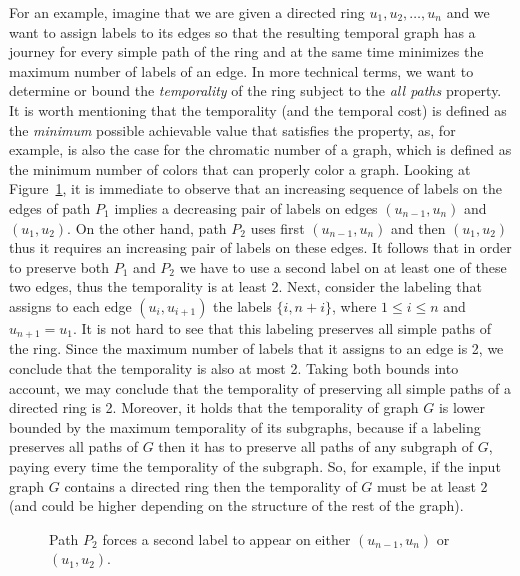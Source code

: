 \documentclass[oribibl, 11pt]{llncs}
\begin{document}
For an example, imagine that we are given a directed ring $u_1,u_2,\ldots,u_n$ and we want to assign labels to its edges so that the resulting temporal graph has a journey for every simple path of the ring and at the same time minimizes the maximum number of labels of an edge. In more technical terms, we want to determine or bound the \emph{temporality} of the ring subject to the \emph{all paths} property. It is worth mentioning that the temporality (and the temporal cost) is defined as the \emph{minimum} possible achievable value that satisfies the property, as, for example, is also the case for the chromatic number of a graph, which is defined as the minimum number of colors that can properly color a graph. Looking at Figure~\ref{fig:ring}, it is immediate to observe that an increasing sequence of labels on the edges of path $P_1$ implies a decreasing pair of labels on edges $(u_{n-1},u_n)$ and $(u_1,u_2)$. On the other hand, path $P_2$ uses first $(u_{n-1},u_n)$ and then $(u_1,u_2)$ thus it requires an increasing pair of labels on these edges. It follows that in order to preserve both $P_1$ and $P_2$ we have to use a second label on at least one of these two edges, thus the temporality is at least 2. Next, consider the labeling that assigns to each edge $(u_i,u_{i+1})$ the labels $\{i, n+i\}$, where $1\leq i\leq n$ and $u_{n+1}=u_1$. It is not hard to see that this labeling preserves all simple paths of the ring. Since the maximum number of labels that it assigns to an edge is 2, we conclude that the temporality is also at most 2. Taking both bounds into account, we may conclude that the temporality of preserving all simple paths of a directed ring is 2. Moreover, it holds that the temporality of graph $G$ is lower bounded by the maximum temporality of its subgraphs, because if a labeling preserves all paths of $G$ then it has to preserve all paths of any subgraph of $G$, paying every time the temporality of the subgraph. So, for example, if the input graph $G$ contains a directed ring then the temporality of $G$ must be at least $2$ (and could be higher depending on the structure of the rest of the graph).   

\begin{figure}[!hbtp]
\caption{Path $P_2$ forces a second label to appear on either $(u_{n-1},u_n)$ or $(u_1,u_2)$.} \label{fig:ring}
\end{figure}
\end{document}
